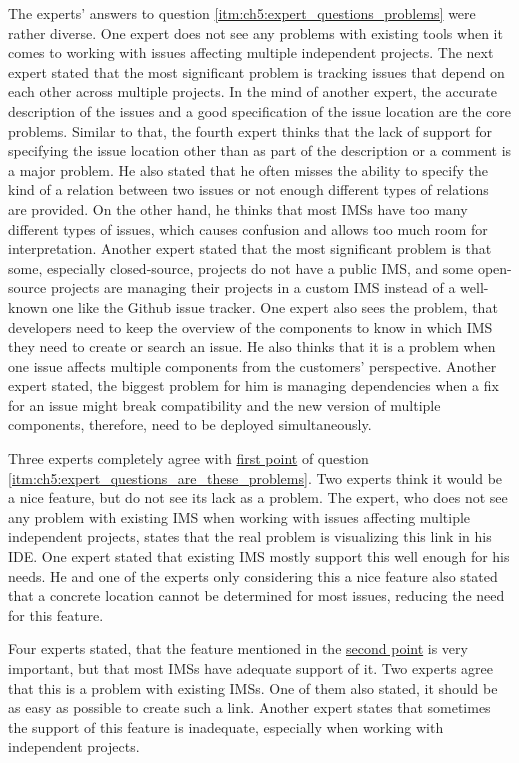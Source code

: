 The experts' answers to question \ref{itm:ch5:expert_questions_problems} were rather diverse.
One expert does not see any problems with existing tools when it comes to working with issues affecting multiple independent projects.
The next expert stated that the most significant problem is tracking issues that depend on each other across multiple projects.
In the mind of another expert, the accurate description of the issues and a good specification of the issue location are the core problems.
Similar to that, the fourth expert thinks that the lack of support for specifying the issue location other than as part of the description or a comment is a major problem.
He also stated that he often misses the ability to specify the kind of a relation between two issues or not enough different types of relations are provided.
On the other hand, he thinks that most \glspl{IMS} have too many different types of issues, which causes confusion and allows too much room for interpretation.
Another expert stated that the most significant problem is that some, especially closed-source, projects do not have a public \gls{IMS}, and some open-source projects are managing their projects in a custom \gls{IMS} instead of a well-known one like the Github issue tracker.
One expert also sees the problem, that developers need to keep the overview of the components to know in which \gls{IMS} they need to create or search an issue.
He also thinks that it is a problem when one issue affects multiple components from the customers' perspective.
Another expert stated, the biggest problem for him is managing dependencies when a fix for an issue might break compatibility and the new version of multiple components, therefore, need to be deployed simultaneously. 

Three experts completely agree with \hyperref[itm:ch5:expert_questions_are_these_problems_1]{first point} of question \ref{itm:ch5:expert_questions_are_these_problems}.
Two experts think it would be a nice feature, but do not see its lack as a problem.
The expert, who does not see any problem with existing \gls{IMS} when working with issues affecting multiple independent projects, states that the real problem is visualizing this link in his \gls{IDE}.
One expert stated that existing \gls{IMS} mostly support this well enough for his needs.
He and one of the experts only considering this a nice feature also stated that a concrete location cannot be determined for most issues, reducing the need for this feature.

Four experts stated, that the feature mentioned in the \hyperref[itm:ch5:expert_questions_are_these_problems_2]{second point} is very important,
but that most \glspl{IMS} have adequate support of it.
Two experts agree that this is a problem with existing \glspl{IMS}.
One of them also stated, it should be as easy as possible to create such a link.
Another expert states that sometimes the support of this feature is inadequate, especially when working with independent projects.

